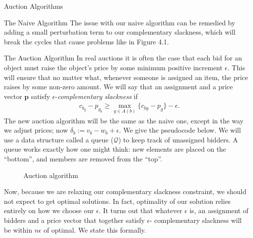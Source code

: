 \begin{section}{Auction Algorithms}
\begin{subsection}{The Naive Algorithm}
		The issue with our naive algorithm can be remedied by adding a small perturbation term 
		to our complementary slackness, which will break the cycles that cause problems like in 
		Figure 4.1.
	\end{subsection}
	\begin{subsection}{The Auction Algorithm}
		In real auctions it is often the case that each bid for an object must raise the 
		object's price by some minimum positive increment $\epsilon$. 
		This will ensure that no matter what, whenever someone 
		is assigned an item, the price raises by some non-zero amount. We will say that 
		an assignment and a price vector $\mathbf{p}$ satisfy $\epsilon$-\emph{complementary 
		slackness} if 
		\begin{align}
			& c_{b_g} - p_{g_b} \geq \max_{g\in A(b)} \{c_{bg} - p_g\} - \epsilon.
		\end{align}
		The new auction algorithm will be the same as the naive one, except in the way we 
		adjust prices; now $\delta_b := v_b - w_b + \epsilon$. We give the pseudocode below. We 
		will use a data structure called a queue ($\mathcal{Q}$) to keep track of unassigned 
		bidders. A queue works exactly how one might think: new elements are placed on the 
		``bottom'', and members are removed from the ``top''.
		\singlespace
		\begin{figure}[h]
		\centering
			\noindent{}
			\caption{Auction algorithm}
		\end{figure}
		\doublespacing
		Now, because we are relaxing our complementary slackness constraint, we should not 
		expect to get optimal solutions. In fact, optimality of our solution relies entirely on 
		how we choose our $\epsilon$. It turns out that whatever $\epsilon$ is, 
		an assignment of bidders and a price vector that together satisfy $\epsilon$-
		complementary slackness will be within $n\epsilon$ of optimal. We state this formally.

\end{subsection}
\end{section}
